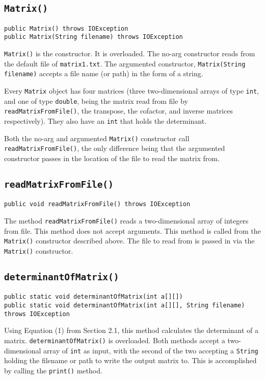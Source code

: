 \documentclass[12pt]{article}
\begin{document}
\subsection{\texttt{Matrix()}}
\begin{verbatim}
public Matrix() throws IOException
public Matrix(String filename) throws IOException
\end{verbatim}
\texttt{Matrix()} is the constructor. It is overloaded. The no-arg constructor reads from the default file of \texttt{matrix1.txt}. The argumented constructor, \texttt{Matrix(String filename)} accepts a file name (or path) in the form of a string.
\par Every \texttt{Matrix} object has four matrices (three two-dimensional arrays of type \texttt{int}, and one of type \texttt{double}, being the matrix read from file by \texttt{readMatrixFromFile()}, the transpose, the cofactor, and inverse matrices respectively). They also have an \texttt{int} that holds the determinant.
\par Both the no-arg and argumented \texttt{Matrix()} constructor call \texttt{readMatrixFromFile()}, the only difference being that the argumented constructor passes in the location of the file to read the matrix from.

\subsection{\texttt{readMatrixFromFile()}}
\begin{verbatim}
public void readMatrixFromFile() throws IOException
\end{verbatim}
The method \texttt{readMatrixFromFile()} reads a two-dimensional array of integers from file. This method does not accept arguments. This method is called from the \texttt{Matrix()} constructor described above. The file to read from is passed in via the \texttt{Matrix()} constructor.

\subsection{\texttt{determinantOfMatrix()}}
\begin{verbatim}
public static void determinantOfMatrix(int a[][])
public static void determinantOfMatrix(int a[][], String filename) throws IOException
\end{verbatim}
Using Equation (1) from Section 2.1, this method calculates the determinant of a matrix. \texttt{determinantOfMatrix()} is overloaded. Both methods accept a two-dimensional array of \texttt{int} as input, with the second of the two accepting a \texttt{String} holding the filename or path to write the output matrix to. This is accomplished by calling the \texttt{print()} method.
\end{document}
